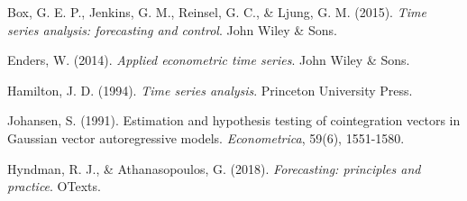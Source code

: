 \documentclass[11pt,a4paper]{article}
\begin{document}
\begin{thebibliography}{99}

 Box, G. E. P., Jenkins, G. M., Reinsel, G. C., \& Ljung, G. M. (2015). \textit{Time series analysis: forecasting and control}. John Wiley \& Sons.

 Enders, W. (2014). \textit{Applied econometric time series}. John Wiley \& Sons.

 Hamilton, J. D. (1994). \textit{Time series analysis}. Princeton University Press.

 Johansen, S. (1991). Estimation and hypothesis testing of cointegration vectors in Gaussian vector autoregressive models. \textit{Econometrica}, 59(6), 1551-1580.

 Hyndman, R. J., \& Athanasopoulos, G. (2018). \textit{Forecasting: principles and practice}. OTexts.

\end{thebibliography}
\end{document}
